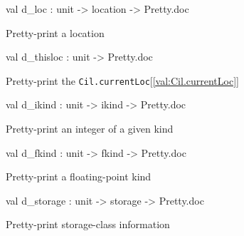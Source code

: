 \documentclass[11pt]{article}
\begin{document}
\label{val:Cil.d-underscoreloc}\begin{ocamldoccode}
val d_loc : unit -> location -> Pretty.doc
\end{ocamldoccode}
\begin{ocamldocdescription}
Pretty-print a location


\end{ocamldocdescription}




\label{val:Cil.d-underscorethisloc}\begin{ocamldoccode}
val d_thisloc : unit -> Pretty.doc
\end{ocamldoccode}
\begin{ocamldocdescription}
Pretty-print the {\tt{Cil.currentLoc}}[\ref{val:Cil.currentLoc}]


\end{ocamldocdescription}




\label{val:Cil.d-underscoreikind}\begin{ocamldoccode}
val d_ikind : unit -> ikind -> Pretty.doc
\end{ocamldoccode}
\begin{ocamldocdescription}
Pretty-print an integer of a given kind


\end{ocamldocdescription}




\label{val:Cil.d-underscorefkind}\begin{ocamldoccode}
val d_fkind : unit -> fkind -> Pretty.doc
\end{ocamldoccode}
\begin{ocamldocdescription}
Pretty-print a floating-point kind


\end{ocamldocdescription}




\label{val:Cil.d-underscorestorage}\begin{ocamldoccode}
val d_storage : unit -> storage -> Pretty.doc
\end{ocamldoccode}
\begin{ocamldocdescription}
Pretty-print storage-class information


\end{ocamldocdescription}
\end{document}
